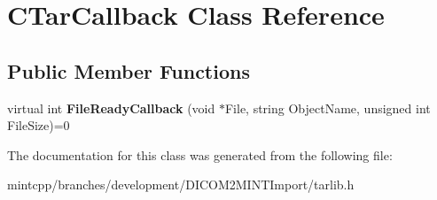 \hypertarget{class_c_tar_callback}{
\section{CTarCallback Class Reference}
\label{class_c_tar_callback}
}
\subsection*{Public Member Functions}
\begin{DoxyCompactItemize}
\item 
\hypertarget{class_c_tar_callback_af4557066eb5887f4d0538f197f13ce06}{
virtual int {\bfseries FileReadyCallback} (void $\ast$File, string ObjectName, unsigned int FileSize)=0}
\label{class_c_tar_callback_af4557066eb5887f4d0538f197f13ce06}

\end{DoxyCompactItemize}


The documentation for this class was generated from the following file:\begin{DoxyCompactItemize}
\item 
mintcpp/branches/development/DICOM2MINTImport/tarlib.h\end{DoxyCompactItemize}
